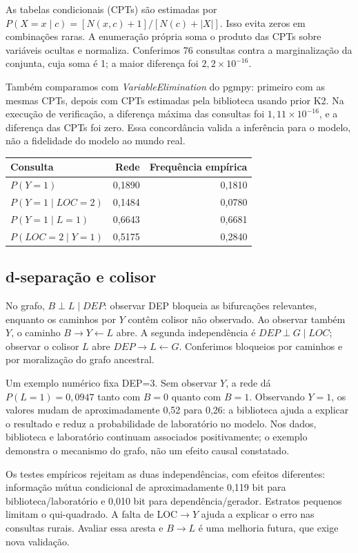 \documentclass[10pt,a4paper]{article}
\begin{document}
As tabelas condicionais (CPTs) são estimadas por
$P(X=x\mid c)=[N(x,c)+1]/[N(c)+|X|]$. Isso evita zeros em combinações raras. A enumeração própria soma o produto das CPTs sobre variáveis ocultas e normaliza. Conferimos 76 consultas contra a marginalização da conjunta, cuja soma é 1; a maior diferença foi $2,2\times10^{-16}$.

Também comparamos com \emph{VariableElimination} do pgmpy: primeiro com as mesmas CPTs, depois com CPTs estimadas pela biblioteca usando prior K2. Na execução de verificação, a diferença máxima das consultas foi $1,11\times10^{-16}$, e a diferença das CPTs foi zero. Essa concordância valida a inferência para o modelo, não a fidelidade do modelo ao mundo real.

\begin{center}\small
\begin{tabular}{lrr}\toprule
Consulta & Rede & Frequência empírica\\\midrule
$P(Y=1)$ & 0,1890 & 0,1810\\
$P(Y=1\mid LOC=2)$ & 0,1484 & 0,0780\\
$P(Y=1\mid L=1)$ & 0,6643 & 0,6681\\
$P(LOC=2\mid Y=1)$ & 0,5175 & 0,2840\\\bottomrule
\end{tabular}\end{center}

\subsection{d-separação e colisor}
No grafo, $B\perp L\mid DEP$: observar DEP bloqueia as bifurcações relevantes, enquanto os caminhos por $Y$ contêm colisor não observado. Ao observar também $Y$, o caminho $B\to Y\leftarrow L$ abre. A segunda independência é $DEP\perp G\mid LOC$; observar o colisor $L$ abre $DEP\to L\leftarrow G$. Conferimos bloqueios por caminhos e por moralização do grafo ancestral.

Um exemplo numérico fixa DEP=3. Sem observar $Y$, a rede dá $P(L=1)=0,0947$ tanto com $B=0$ quanto com $B=1$. Observando $Y=1$, os valores mudam de aproximadamente 0,52 para 0,26: a biblioteca ajuda a explicar o resultado e reduz a probabilidade de laboratório no modelo. Nos dados, biblioteca e laboratório continuam associados positivamente; o exemplo demonstra o mecanismo do grafo, não um efeito causal constatado.

Os testes empíricos rejeitam as duas independências, com efeitos diferentes: informação mútua condicional de aproximadamente 0,119 bit para biblioteca/laboratório e 0,010 bit para dependência/gerador. Estratos pequenos limitam o qui-quadrado. A falta de LOC$\to Y$ ajuda a explicar o erro nas consultas rurais. Avaliar essa aresta e $B\to L$ é uma melhoria futura, que exige nova validação.
\end{document}
